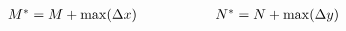 \documentclass[../main.tex]{subfiles}%
\begin{document}
%
    \Xequation%
    \begin{equation}%
        \begin{array}{ c p{0.50in} c }%
        M^{*} = M + \max(\Delta x) & & N^{*} = N + \max(\Delta y) \\%
        \end{array}%
        \label{eq:mosaic-stitch-matrix-size}%
    \end{equation}%
\end{document}
